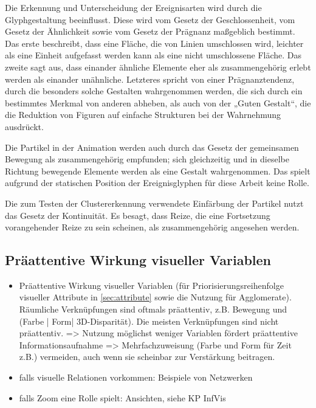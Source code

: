 Die Erkennung und Unterscheidung der Ereignisarten wird durch die Glyphgestaltung beeinflusst. Diese wird vom Gesetz der Geschlossenheit, vom Gesetz der Ähnlichkeit sowie vom Gesetz der Prägnanz maßgeblich bestimmt. Das erste beschreibt, dass eine Fläche, die von Linien umschlossen wird, leichter als eine Einheit aufgefasst werden kann als eine nicht umschlossene Fläche. Das zweite sagt aus, dass einander ähnliche Elemente eher als zusammengehörig erlebt werden als einander unähnliche. Letzteres spricht von einer Prägnanztendenz, durch die besonders solche Gestalten wahrgenommen werden, die sich durch ein bestimmtes Merkmal von anderen abheben, als auch von der „Guten Gestalt“, die die Reduktion von Figuren auf einfache Strukturen bei der Wahrnehmung ausdrückt.

Die Partikel in der Animation werden auch durch das Gesetz der gemeinsamen Bewegung als zusammengehörig empfunden; sich gleichzeitig und in dieselbe Richtung bewegende Elemente werden als eine Gestalt wahrgenommen. Das spielt aufgrund der statischen Position der Ereignisglyphen für diese Arbeit keine Rolle.

Die zum Testen der Clustererkennung verwendete Einfärbung der Partikel nutzt das Gesetz der Kontinuität. Es besagt, dass Reize, die eine Fortsetzung vorangehender Reize zu sein scheinen, als zusammengehörig angesehen werden.

\subsection{Präattentive Wirkung visueller Variablen}

\begin{itemize}
	\item Präattentive Wirkung visueller Variablen (für Priorisierungsreihenfolge visueller Attribute in \autoref{sec:attribute} sowie die Nutzung für Agglomerate). Räumliche Verknüpfungen sind oftmals präattentiv, z.B. Bewegung und (Farbe | Form| 3D-Disparität). Die meisten Verknüpfungen sind nicht präattentiv. => Nutzung möglichst weniger Variablen fördert präattentive Informationsaufnahme =>  Mehrfachzuweisung (Farbe und Form für Zeit z.B.) vermeiden, auch wenn sie scheinbar zur Verstärkung beitragen.
	\item falls visuelle Relationen vorkommen: Beispiele von Netzwerken
	\item falls Zoom eine Rolle spielt: Ansichten, siehe KP InfVis
\end{itemize}

